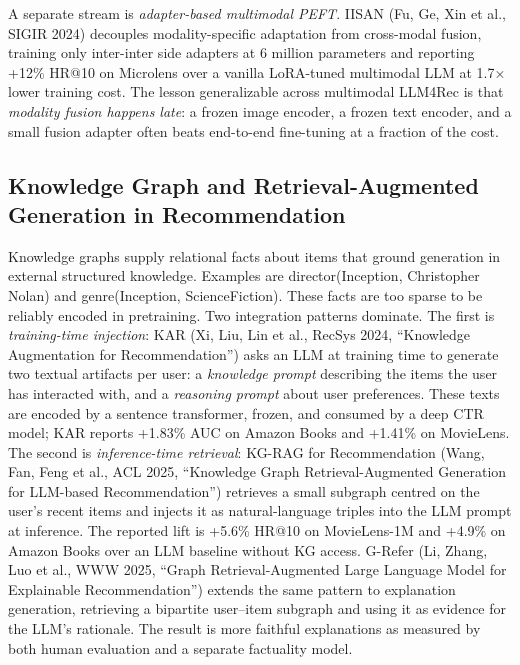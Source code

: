 A separate stream is \emph{adapter-based multimodal PEFT}. IISAN (Fu, Ge, Xin et al., SIGIR 2024) decouples modality-specific adaptation from cross-modal fusion, training only inter-inter side adapters at 6 million parameters and reporting +12\% HR@10 on Microlens over a vanilla LoRA-tuned multimodal LLM at 1.7× lower training cost. The lesson generalizable across multimodal LLM4Rec is that \emph{modality fusion happens late}: a frozen image encoder, a frozen text encoder, and a small fusion adapter often beats end-to-end fine-tuning at a fraction of the cost.

\subsection{Knowledge Graph and Retrieval-Augmented Generation in Recommendation}\label{knowledge-graph-and-retrieval-augmented-generation-in-recommendation}

Knowledge graphs supply relational facts about items that ground generation in external structured knowledge. Examples are director(Inception, Christopher Nolan) and genre(Inception, ScienceFiction). These facts are too sparse to be reliably encoded in pretraining. Two integration patterns dominate. The first is \emph{training-time injection}: KAR (Xi, Liu, Lin et al., RecSys 2024, ``Knowledge Augmentation for Recommendation'') asks an LLM at training time to generate two textual artifacts per user: a \emph{knowledge prompt} describing the items the user has interacted with, and a \emph{reasoning prompt} about user preferences. These texts are encoded by a sentence transformer, frozen, and consumed by a deep CTR model; KAR reports +1.83\% AUC on Amazon Books and +1.41\% on MovieLens. The second is \emph{inference-time retrieval}: KG-RAG for Recommendation (Wang, Fan, Feng et al., ACL 2025, ``Knowledge Graph Retrieval-Augmented Generation for LLM-based Recommendation'') retrieves a small subgraph centred on the user's recent items and injects it as natural-language triples into the LLM prompt at inference. The reported lift is +5.6\% HR@10 on MovieLens-1M and +4.9\% on Amazon Books over an LLM baseline without KG access. G-Refer (Li, Zhang, Luo et al., WWW 2025, ``Graph Retrieval-Augmented Large Language Model for Explainable Recommendation'') extends the same pattern to explanation generation, retrieving a bipartite user--item subgraph and using it as evidence for the LLM's rationale. The result is more faithful explanations as measured by both human evaluation and a separate factuality model.

